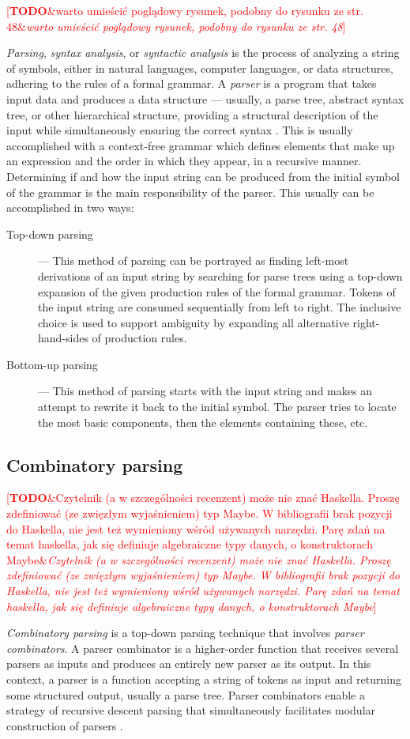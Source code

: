 \documentclass[english,bachelors,forcepolishlogotype]{wizthesis}
\newcommand{\todo}[1]{%
  \textcolor{red}{[\textbf{TODO}\ifx&#1&{}\else{ }\fi\emph{#1}]}%
}
\begin{document}
\todo{warto umieścić poglądowy rysunek, podobny do rysunku ze str. 48}

\emph{Parsing}, \emph{syntax analysis}, or \emph{syntactic analysis} is the
process of analyzing a string of symbols, either in natural languages, computer
languages, or data structures, adhering to the rules of a formal grammar. A
\emph{parser} is a program that takes input data and produces a data structure
--- usually, a parse tree, abstract syntax tree, or other hierarchical
structure, providing a structural description of the input while simultaneously
ensuring the correct syntax \cite{aho-2019,sipser-2009}. This is usually
accomplished with a context-free grammar which defines elements that make up an
expression and the order in which they appear, in a recursive manner.
Determining if and how the input string can be produced from the initial symbol
of the grammar is the main responsibility of the parser. This usually can be
accomplished in two ways:
\begin{description}
  \item[Top-down parsing] --- This method of parsing can be portrayed as finding
  left-most derivations of an input string by searching for parse trees using a
  top-down expansion of the given production rules of the formal grammar. Tokens
  of the input string are consumed sequentially from left to right. The
  inclusive choice is used to support ambiguity by expanding all alternative
  right-hand-sides of production rules.
  \item[Bottom-up parsing] --- This method of parsing starts with the input string
  and makes an attempt to rewrite it back to the initial symbol. The parser
  tries to locate the most basic components, then the elements containing these,
  etc.
\end{description}

\subsection{Combinatory parsing}

\todo{Czytelnik (a w szczególności recenzent) może nie znać Haskella. Proszę
zdefiniować (ze zwięzłym wyjaśnieniem) typ Maybe. W bibliografii brak pozycji do
Haskella, nie jest też wymieniony wśród używanych narzędzi. Parę zdań na temat
haskella, jak się definiuje algebraiczne typy danych, o konstruktorach Maybe}

\emph{Combinatory parsing} is a top-down parsing technique that involves
\emph{parser combinators}. A parser combinator is a higher-order function that
receives several parsers as inputs and produces an entirely new parser as its
output. In this context, a parser is a function accepting a string of tokens as
input and returning some structured output, usually a parse tree. Parser
combinators enable a strategy of recursive descent parsing that simultaneously
facilitates modular construction of parsers \cite{swierstra-2009}.
\end{document}
